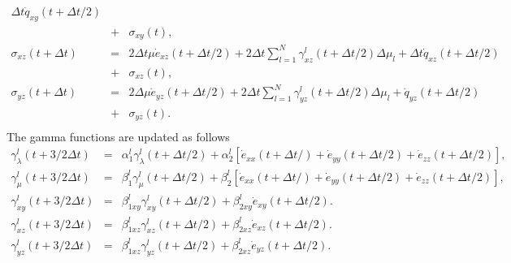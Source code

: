 \documentclass[11pt]{article}
\begin{document}
{\begin{eqnarray}
                                \Delta t \dot{q}_{xy}(t+\Delta t/2)\nonumber\\
                          & + & \sigma_{xy}(t)\nonumber,\\
  \sigma_{xz}(t+\Delta t) & = & 2\Delta t\mu \dot{e}_{xz}(t+\Delta t/2) + 2\Delta t \sum_{l=1}^N\gamma^l_{xz}(t+\Delta t/2)\Delta\mu_l+
                                    \Delta t \dot{q}_{xz}(t+\Delta t/2)\nonumber\\ 
                          & +& \sigma_{xz}(t),\\
  \sigma_{yz}(t+\Delta t) & = & 2\Delta \mu \dot{e}_{yz}(t+\Delta t/2) + 2\Delta t\sum_{l=1}^N\gamma^l_{yz}(t+\Delta t/2)\Delta\mu_l
                                   +\dot{q}_{yz}(t+\Delta t/2)\nonumber\\
                          & +& \sigma_{yz}(t)\nonumber.\\
                          \label{eq:stress}
\end{eqnarray} 
The gamma functions are updated as follows
\begin{eqnarray}
\gamma^l_{\lambda}(t+3/2\Delta t)  & = &\alpha^l_1 \gamma^l_{\lambda}(t+\Delta t/2) 
                        + \alpha^l_2\left[ \dot{e}_{xx}(t+\Delta t/)+ \dot{e}_{yy}(t+\Delta t/2)
                        +\dot{e}_{zz}(t+\Delta t/2)\right] ,\nonumber \\
\gamma^l_{\mu}(t+3/2\Delta t)     & = &\beta^l_1 \gamma^l_{\mu}(t+\Delta t/2) 
                        + \beta^l_2\left[ \dot{e}_{xx}(t+\Delta t/)+ \dot{e}_{yy}(t+\Delta t/2)
                        +\dot{e}_{zz}(t+\Delta t/2)\right] ,\nonumber \\
\gamma^l_{xy}(t+3/2\Delta t)      & = &\beta^l_{1xy} \gamma^l_{xy}(t + \Delta t/2) 
                        + \beta^l_{2xy}\dot{e}_{xy}(t+\Delta t/2).\nonumber\\
\gamma^l_{xz}(t+3/2\Delta t)      & = &\beta^l_{1xz} \gamma^l_{xz}(t + \Delta t/2) 
                        + \beta^l_{2xz}\dot{e}_{xz}(t+\Delta t/2).\nonumber\\
\gamma^l_{yz}(t+3/2\Delta t)      & = &\beta^l_{1xz} \gamma^l_{yz}(t + \Delta t/2) 
                        + \beta^l_{2xz}\dot{e}_{yz}(t+\Delta t/2).\nonumber\\
\end{eqnarray}

}
\end{document}
